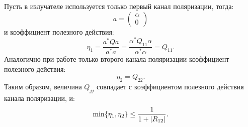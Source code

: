 Пусть в излучателе используется только первый канал поляризации, тогда:
\[
    a
    = \begin{pmatrix}
          \alpha \\
          0
    \end{pmatrix}
\]
и коэффициент полезного действия:
\[
    \eta_1
    = \frac{a^* Q a}{a^* a}
    = \frac{\alpha^* Q_{11} \alpha}{\alpha^* \alpha}
    = Q_{11}.
\]
Аналогично при работе только второго канала поляризации коэффициент полезного действия:
\[
    \eta_2 = Q_{22} .
\]
Таким образом, величина $Q_{jj}$ совпадает с коэффициентом полезного действия канала поляризации, и:
\[
    \min \{ \eta_1, \eta_2 \} \le \frac{1}{1 + \left | R_{12} \right |} .
\]